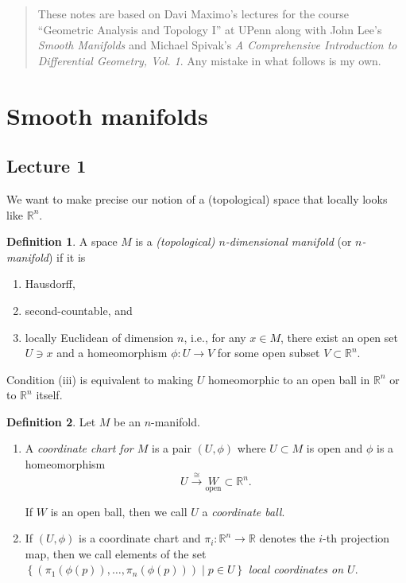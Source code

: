 \documentclass[10pt,letterpaper,cm]{nupset}
\theoremstyle{definition}
\newtheorem{definition}{Definition}[subsection]
\theoremstyle{theorem}
\theoremstyle{remark}
\newcommand{\R}{\mathbb R}
\newcommand{\1}{\mathbf{1}}
\newcommand{\0}{\vec 0}
\begin{document}
\thispagestyle{empty}
\begin{abstract}
These notes are based on Davi Maximo's lectures for the course ``Geometric Analysis and Topology I'' at UPenn along with John Lee's \textit{Smooth Manifolds} and Michael Spivak's \textit{A Comprehensive Introduction to Differential Geometry, Vol. 1}. Any mistake in what follows is my own.
\end{abstract}


\tableofcontents
\newpage

\section{Smooth manifolds}

\subsection{Lecture 1}

We want to make precise our notion of a (topological) space that locally looks like $\R^n$.

\theoremstyle{definition}
\begin{definition}{A space $M$ is a \textit{(topological) $n$-dimensional manifold} (or \textit{$n$-manifold}) if it is 
\begin{enumerate}[label=(\roman*)]
\item Hausdorff, 
\item second-countable, and 
\item locally Euclidean of dimension $n$, i.e., for any $x\in M$, there exist an open set $U\ni x$ and a homeomorphism $\phi : U \to V$ for some open subset $V\subset \R^n$.
\end{enumerate}
}
\end{definition}

Condition (iii) is equivalent to making $U$ homeomorphic to an open ball in $\R^n$ or to $\R^n$ itself.

\begin{definition} Let $M$ be an $n$-manifold.
\begin{enumerate}
\item  A \textit{coordinate chart for $M$} is a pair $(U, \phi)$ where $U\subset M$ is open and $\phi$ is a homeomorphism $$U \overset{\cong}{\longrightarrow} \underset{\text{open}} W \subset \R^n.$$

If $W$ is an open ball, then we call $U$ a \textit{coordinate ball}.
\item If $(U, \phi)$ is a coordinate chart and $\pi_i : \R^n \to \R$ denotes the $i$-th projection map, then we call elements of the set $\left\{\left(\pi_1(\phi(p)), \ldots, \pi_n(\phi(p))\right) \mid p \in U\right\}$ \textit{local coordinates on $U$}.
\end{enumerate}
\end{definition}
\end{document}
